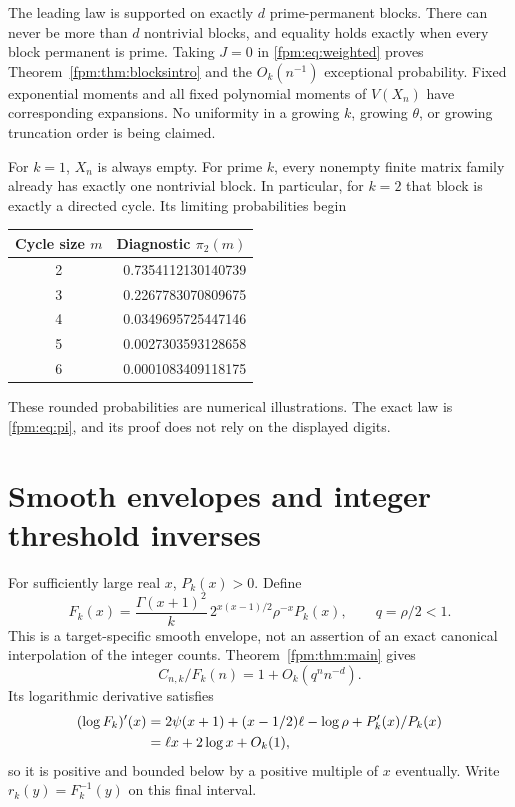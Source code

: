 \documentclass[11pt]{article}
\theoremstyle{definition}\newtheorem{definition}[theorem]{Definition}
\theoremstyle{remark}\newtheorem{remark}[theorem]{Remark}
\begin{document}
The leading law is supported on exactly $d$ prime-permanent blocks. There can never be more than $d$ nontrivial blocks, and equality holds exactly when every block permanent is prime. Taking $J=0$ in \eqref{fpm:eq:weighted} proves Theorem~\ref{fpm:thm:blocksintro} and the $O_k(n^{-1})$ exceptional probability. Fixed exponential moments and all fixed polynomial moments of $V(X_n)$ have corresponding expansions. No uniformity in a growing $k$, growing $\theta$, or growing truncation order is being claimed.

For $k=1$, $X_n$ is always empty. For prime $k$, every nonempty finite matrix family already has exactly one nontrivial block. In particular, for $k=2$ that block is exactly a directed cycle. Its limiting probabilities begin
\begin{center}
\begin{tabular}{c r}
\toprule
Cycle size $m$ & Diagnostic $\pi_2(m)$\\
\midrule
2&0.7354112130140739\\
3&0.2267783070809675\\
4&0.0349695725447146\\
5&0.0027303593128658\\
6&0.0001083409118175\\
\bottomrule
\end{tabular}
\end{center}
These rounded probabilities are numerical illustrations. The exact law is \eqref{fpm:eq:pi}, and its proof does not rely on the displayed digits.

\section{Smooth envelopes and integer threshold inverses}\label{fpm:sec:inverse}
For sufficiently large real $x$, $P_k(x)>0$. Define
\begin{equation}\label{fpm:eq:envelope}
 F_k(x)=\frac{\Gamma(x+1)^2}{k}\,2^{x(x-1)/2}\rho^{-x}P_k(x),
 \qquad q=\rho/2<1.
\end{equation}
This is a target-specific smooth envelope, not an assertion of an exact canonical interpolation of the integer counts. Theorem~\ref{fpm:thm:main} gives
\[
 C_{n,k}/F_k(n)=1+O_k(q^n n^{-d}).
\]
Its logarithmic derivative satisfies
\begin{align}
 (\log F_k)'(x)
 &=2\psi(x+1)+(x-1/2)\ell-\log\rho+P_k'(x)/P_k(x)\notag\\
 &=\ell x+2\log x+O_k(1),\label{fpm:eq:logder}
\end{align}
so it is positive and bounded below by a positive multiple of $x$ eventually. Write $r_k(y)=F_k^{-1}(y)$ on this final interval.
\end{document}
